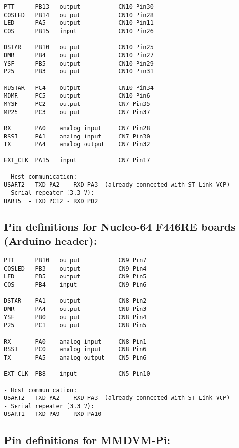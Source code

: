 \documentclass[]{article}
\begin{document}
\begin{verbatim}
PTT      PB13   output           CN10 Pin30
COSLED   PB14   output           CN10 Pin28
LED      PA5    output           CN10 Pin11
COS      PB15   input            CN10 Pin26

DSTAR    PB10   output           CN10 Pin25
DMR      PB4    output           CN10 Pin27
YSF      PB5    output           CN10 Pin29
P25      PB3    output           CN10 Pin31

MDSTAR   PC4    output           CN10 Pin34
MDMR     PC5    output           CN10 Pin6
MYSF     PC2    output           CN7 Pin35
MP25     PC3    output           CN7 Pin37

RX       PA0    analog input     CN7 Pin28
RSSI     PA1    analog input     CN7 Pin30
TX       PA4    analog output    CN7 Pin32

EXT_CLK  PA15   input            CN7 Pin17

- Host communication:
USART2 - TXD PA2  - RXD PA3  (already connected with ST-Link VCP)
- Serial repeater (3.3 V):
UART5  - TXD PC12 - RXD PD2
\end{verbatim}

\subsection{Pin definitions for Nucleo-64 F446RE boards (Arduino header):}

\begin{verbatim}
PTT      PB10   output           CN9 Pin7
COSLED   PB3    output           CN9 Pin4
LED      PB5    output           CN9 Pin5
COS      PB4    input            CN9 Pin6

DSTAR    PA1    output           CN8 Pin2
DMR      PA4    output           CN8 Pin3
YSF      PB0    output           CN8 Pin4
P25      PC1    output           CN8 Pin5

RX       PA0    analog input     CN8 Pin1
RSSI     PC0    analog input     CN8 Pin6
TX       PA5    analog output    CN5 Pin6

EXT_CLK  PB8    input            CN5 Pin10

- Host communication:
USART2 - TXD PA2  - RXD PA3  (already connected with ST-Link VCP)
- Serial repeater (3.3 V):
USART1 - TXD PA9  - RXD PA10
\end{verbatim}

\subsection{Pin definitions for MMDVM-Pi:}
\end{document}
